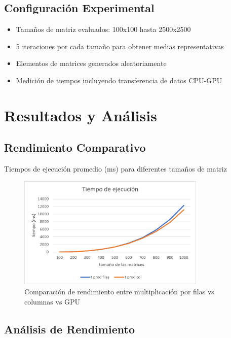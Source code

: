\documentclass[11pt]{article}
\begin{document}
\subsection{Configuración Experimental}
\begin{itemize}
    \item Tamaños de matriz evaluados: 100x100 hasta 2500x2500
    \item 5 iteraciones por cada tamaño para obtener medias representativas
    \item Elementos de matrices generados aleatoriamente
    \item Medición de tiempos incluyendo transferencia de datos CPU-GPU
\end{itemize}

\section{Resultados y Análisis}
\subsection{Rendimiento Comparativo}
\begin{table}[h]
    \centering
    \caption{Tiempos de ejecución promedio (ms) para diferentes tamaños de matriz}
\end{table}

\begin{figure}[h]
    \centering
    \includegraphics[width=0.8\textwidth]{./grafica.png}
    \caption{Comparación de rendimiento entre multiplicación por filas vs columnas vs GPU}
\end{figure}

\subsection{Análisis de Rendimiento}
\end{document}
